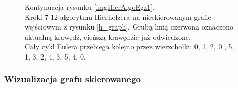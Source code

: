 \documentclass[a4paper, 12pt, twoside, openright]{article}
\begin{document}
\begin{figure}[!p]
		\quad
		
		\caption[]{Kontynuacja rysunku \ref{imgHierAlgoEgz1}.\\Kroki 7-12 algorytmu Hierholzera na nieskierowanym grafie wejściowym z rysunku \ref{h_graph}. Grubą linią czerwoną oznaczono aktualną krawędź, cieńszą krawędzie już odwiedzone.\\Cały cykl Eulera przebiega kolejno przez wierzchołki: 0, 1, 2, 0 , 5, 1, 3, 2, 4, 3, 5, 4, 0.}
		\label{imgHierAlgoEgz2}
	\end{figure}
\newpage
\subsubsection{Wizualizacja grafu skierowanego}
\indent\par
	
\end{document}
